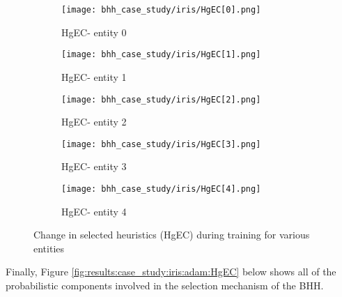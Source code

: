 \begin{figure}[htbp]
      \begin{subfigure}{0.5\textwidth}
            \centering
            \texttt{[image: bhh\_case\_study/iris/HgEC[0].png]}
            \caption{HgEC\rbrack - entity 0}
            \label{fig:results:case_study:iris:HgEC:0}
      \end{subfigure}
      \begin{subfigure}{0.5\textwidth}
            \centering
            \texttt{[image: bhh\_case\_study/iris/HgEC[1].png]}
            \caption{HgEC\rbrack - entity 1}
            \label{fig:results:case_study:iris:HgEC:1}
      \end{subfigure}
      \par\bigskip
      \begin{subfigure}{0.5\textwidth}
            \centering
            \texttt{[image: bhh\_case\_study/iris/HgEC[2].png]}
            \caption{HgEC\rbrack - entity 2}
            \label{fig:results:case_study:iris:HgEC:2}
      \end{subfigure}
      \begin{subfigure}{0.5\textwidth}
            \centering
            \texttt{[image: bhh\_case\_study/iris/HgEC[3].png]}
            \caption{HgEC\rbrack - entity 3}
            \label{fig:results:case_study:iris:HgEC:3}
      \end{subfigure}
      \par\bigskip
      \begin{subfigure}{\textwidth}
            \centering
            \texttt{[image: bhh\_case\_study/iris/HgEC[4].png]}
            \caption{HgEC\rbrack - entity 4}
            \label{fig:results:case_study:iris:HgEC:4}
      \end{subfigure}
      \par\bigskip
      \caption{Change in selected heuristics (HgEC) during training for various entities}
      \label{fig:results:case_study:iris:HgEC}
\end{figure}

Finally, Figure \ref{fig:results:case_study:iris:adam:HgEC} below shows all of the probabilistic components involved in the selection mechanism of the \Ac{BHH}.

